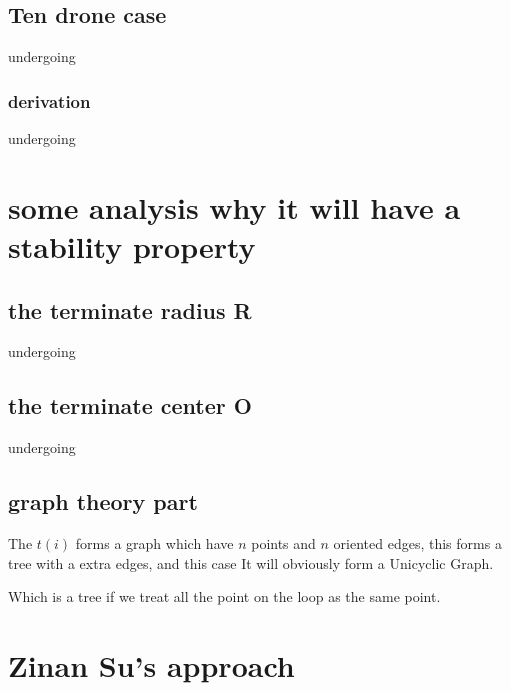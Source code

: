 \documentclass{article}
\theoremstyle{definition} %
\begin{document}
\subsection{Ten drone case}
undergoing
\subsubsection{derivation}
undergoing

\section{some analysis why it will have a stability property}
\subsection{the terminate radius R}
undergoing
\subsection{the terminate center O}
undergoing
\subsection{graph theory part}
The \(t(i)\) forms a graph which have \(n\) points
and \(n\) oriented edges, this forms a tree with a extra
edges, and this case It will obviously form a Unicyclic Graph.

Which is a tree if we treat all the point on the
loop as the same point.

\section{Zinan Su's approach}
\end{document}
